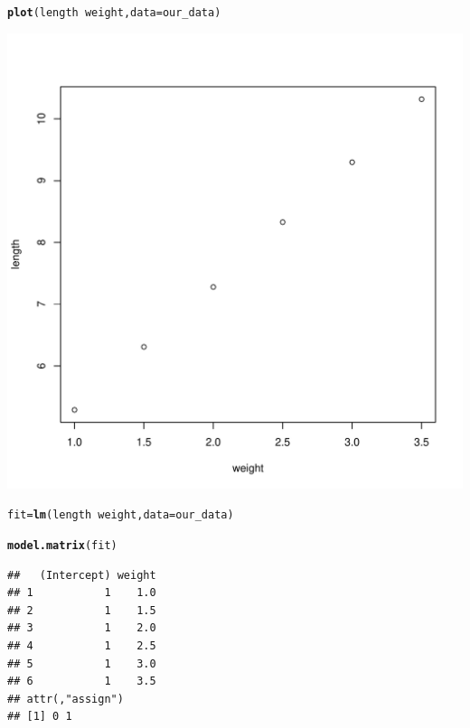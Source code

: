 \documentclass[11pt, a4paper]{article}\usepackage[]{graphicx}\usepackage[]{xcolor}
\makeatletter
\def\maxwidth{ %
  \ifdim\Gin@nat@width>\linewidth
    \linewidth
  \else
    \Gin@nat@width
  \fi
}
\newcommand{\hlopt}[1]{\textcolor[rgb]{0,0,0}{#1}}%
\newcommand{\hlstd}[1]{\textcolor[rgb]{0.345,0.345,0.345}{#1}}%
\newcommand{\hlkwb}[1]{\textcolor[rgb]{0.69,0.353,0.396}{#1}}%
\newcommand{\hlkwc}[1]{\textcolor[rgb]{0.333,0.667,0.333}{#1}}%
\newcommand{\hlkwd}[1]{\textcolor[rgb]{0.737,0.353,0.396}{\textbf{#1}}}%
\newenvironment{kframe}{%
 \def\at@end@of@kframe{}%
 \ifinner\ifhmode%
  \def\at@end@of@kframe{\end{minipage}}%
  \begin{minipage}{\columnwidth}%
 \fi\fi%
 \def\FrameCommand##1{\hskip\@totalleftmargin \hskip-\fboxsep
 \colorbox{shadecolor}{##1}\hskip-\fboxsep
     \hskip-\linewidth \hskip-\@totalleftmargin \hskip\columnwidth}%
 \MakeFramed {\advance\hsize-\width
   \@totalleftmargin\z@ \linewidth\hsize
   \@setminipage}}%
 {\par\unskip\endMakeFramed%
 \at@end@of@kframe}
\newenvironment{knitrout}{}{} %
\makeatother
\begin{document}
\begin{knitrout}
\color{fgcolor}\begin{kframe}
\begin{alltt}
\hlkwd{plot}\hlstd{(length} \hlopt{~} \hlstd{weight,} \hlkwc{data} \hlstd{= our_data)}
\end{alltt}
\end{kframe}
\includegraphics[width=\maxwidth]{figure/unnamed-chunk-2-1} 
\end{knitrout}

\begin{knitrout}
\color{fgcolor}\begin{kframe}
\begin{alltt}
\hlstd{fit} \hlkwb{=} \hlkwd{lm}\hlstd{(length} \hlopt{~} \hlstd{weight,} \hlkwc{data} \hlstd{= our_data)}
\end{alltt}
\end{kframe}
\end{knitrout}

\begin{knitrout}
\color{fgcolor}\begin{kframe}
\begin{alltt}
\hlkwd{model.matrix}\hlstd{(fit)}
\end{alltt}
\begin{verbatim}
##   (Intercept) weight
## 1           1    1.0
## 2           1    1.5
## 3           1    2.0
## 4           1    2.5
## 5           1    3.0
## 6           1    3.5
## attr(,"assign")
## [1] 0 1
\end{verbatim}
\end{kframe}
\end{knitrout}
\end{document}
